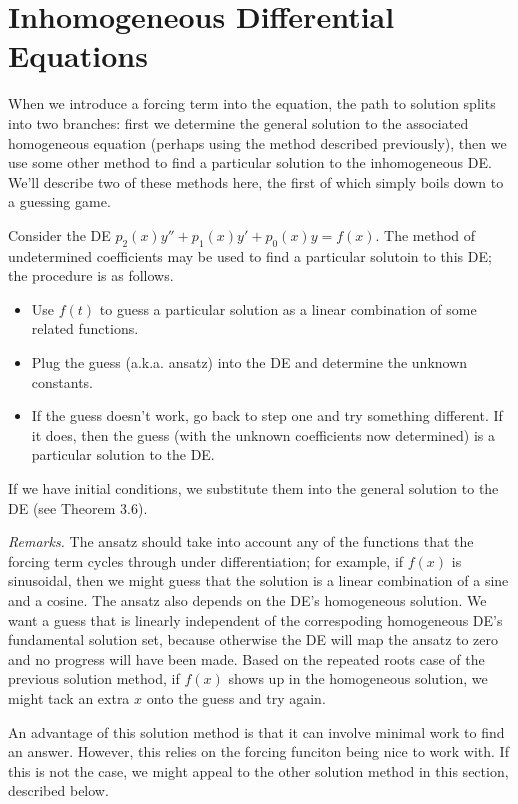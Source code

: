 \documentclass[../m82main.tex]{subfiles}
\begin{document}
\section{Inhomogeneous Differential Equations}
When we introduce a forcing term into the equation, the path to solution splits into two branches: first we determine the general solution to the associated homogeneous equation (perhaps using the method described previously), then we use some other method to find a particular solution to the inhomogeneous DE.
We'll describe two of these methods here, the first of which simply boils down to a guessing game.

\begin{definition}
    Consider the DE $p_2(x)y'' + p_1(x)y' + p_0(x)y = f(x)$.
    The method of undetermined coefficients may be used to find a particular solutoin to this DE; the procedure is as follows.
    \begin{itemize}
        \item Use $f(t)$ to guess a particular solution as a linear combination of some related functions.
        \item Plug the guess (a.k.a. ansatz) into the DE and determine the unknown constants.
        \item If the guess doesn't work, go back to step one and try something different.
        If it does, then the guess (with the unknown coefficients now determined) is a particular solution to the DE.
    \end{itemize}
    If we have initial conditions, we substitute them into the general solution to the DE (see Theorem 3.6).
\end{definition}

\textit{Remarks.}
The ansatz should take into account any of the functions that the forcing term cycles through under differentiation; for example, if $f(x)$ is sinusoidal, then we might guess that the solution is a linear combination of a sine and a cosine.
The ansatz also depends on the DE's homogeneous solution.
We want a guess that is linearly independent of the correspoding homogeneous DE's fundamental solution set, because otherwise the DE will map the ansatz to zero and no progress will have been made.
Based on the repeated roots case of the previous solution method, if $f(x)$ shows up in the homogeneous solution, we might tack an extra $x$ onto the guess and try again.

An advantage of this solution method is that it can involve minimal work to find an answer.
However, this relies on the forcing funciton being nice to work with.
If this is not the case, we might appeal to the other solution method in this section, described below.
\end{document}
